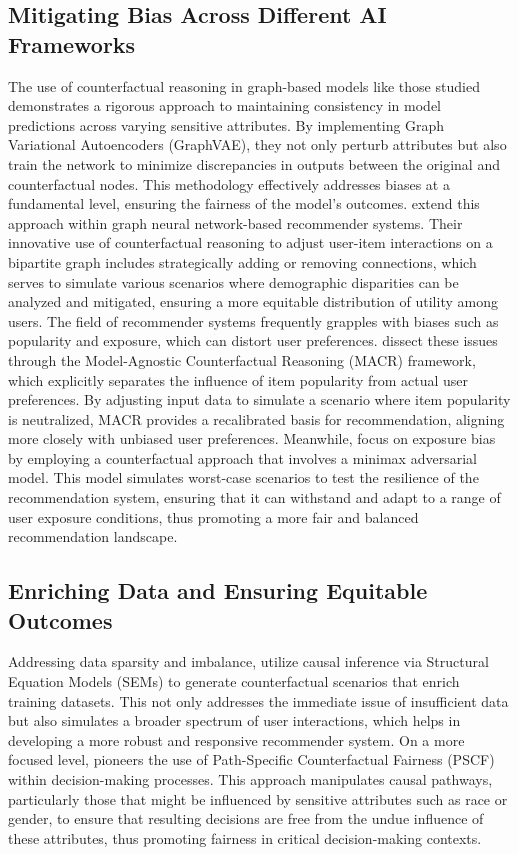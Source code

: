 \subsection{Mitigating Bias Across Different AI Frameworks}

The use of counterfactual reasoning in graph-based models like those studied \textcite{guo_towards_2023} demonstrates a rigorous approach to maintaining consistency in
model predictions across varying sensitive attributes. By implementing Graph Variational
Autoencoders (GraphVAE), they not only perturb attributes but also train the
network to minimize discrepancies in outputs between the original and
counterfactual nodes. This methodology effectively addresses biases at a fundamental
level, ensuring the fairness of the model's outcomes. \textcite{medda_gnnuers_2024} extend
this approach within graph neural network-based recommender systems. Their innovative
use of counterfactual reasoning to adjust user-item interactions on a bipartite graph
includes strategically adding or removing connections, which serves to simulate
various scenarios where demographic disparities can be analyzed and mitigated, ensuring
a more equitable distribution of utility among users. The field of recommender
systems frequently grapples with biases such as popularity and exposure, which can
distort user preferences. \textcite{wei_model-agnostic_2021} dissect these issues through the Model-Agnostic
Counterfactual Reasoning (MACR) framework, which explicitly separates the
influence of item popularity from actual user preferences. By adjusting input data
to simulate a scenario where item popularity is neutralized, MACR provides a
recalibrated basis for recommendation, aligning more closely with unbiased user preferences.
Meanwhile, \textcite{xu_adversarial_2020} focus on exposure bias by employing a counterfactual
approach that involves a minimax adversarial model. This model simulates worst-case
scenarios to test the resilience of the recommendation system, ensuring that it
can withstand and adapt to a range of user exposure conditions, thus promoting a
more fair and balanced recommendation landscape.

\subsection{Enriching Data and Ensuring Equitable Outcomes}

Addressing data sparsity and imbalance, \textcite{yang_top-n_2021} utilize causal
inference via Structural Equation Models (SEMs) to generate counterfactual
scenarios that enrich training datasets. This not only addresses the immediate issue
of insufficient data but also simulates a broader spectrum of user interactions,
which helps in developing a more robust and responsive recommender system. On a more
focused level, \textcite{chiappa_path-specific_2019} pioneers the use of Path-Specific Counterfactual
Fairness (PSCF) within decision-making processes. This approach manipulates causal
pathways, particularly those that might be influenced by sensitive attributes
such as race or gender, to ensure that resulting decisions are free from the undue
influence of these attributes, thus promoting fairness in critical decision-making
contexts.

